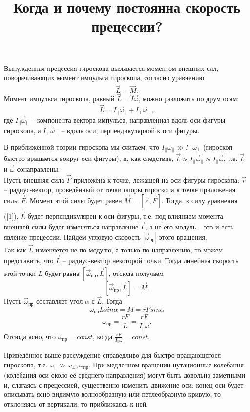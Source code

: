 \documentclass[a4paper, 12pt]{article}
\title{\textbf{Когда и почему постоянна скорость прецессии?}}
\begin{document}
\maketitle

Вынужденная прецессия гироскопа вызывается моментом внешних сил, поворачивающих момент импульса гироскопа, согласно уравнению
\begin{equation}\label{1}
    \dot{\vec{L}} = \vec{M}.
\end{equation}
Момент импульса гироскопа, равный $\vec{L} = \hat{I} \vec{\omega}$, можно разложить по друм осям:
$$
\vec{L} = I_{||} \vec{\omega}_{||} + I_{\perp} \vec{\omega}_{\perp},
$$
где $I_{||} \vec{\omega}_{||}$ -- компонента вектора импульса, направленная вдоль оси фигуры гироскопа, а $I_{\perp} \vec{\omega}_{\perp}$ -- вдоль оси, перпендикулярной к оси фигуры.

В приближённой теории гироскопа мы считаем, что $I_{||} \omega_{||} \gg I_{\perp} \omega_{\perp}$ (гироскоп быстро вращается вокруг оси фигуры), и, как следствие, $\vec{L} \approx I_{||} \vec{\omega}_{||} \approx I_{||} \vec{\omega}$, т.е. $\vec{L}$ и $\vec{\omega}$ сонаправлены.
\\
Пусть внешняя сила $\vec{F}$ приложена к точке, лежащей на оси фигуры гироскопа; $\vec{r}$ -- радиус-вектор, проведённый от точки опоры гироскопа к точке приложения силы $\vec{F}$. Момент этой силы будет равен $\vec{M} = [\vec{r},\vec{F}]$. Тогда, в силу уравнения (\ref{1}), $\dot{\vec{L}}$ будет перпендикулярен к оси фигуры, т.е. под влиянием момента внешней силы будет изменяться направление $\vec{L}$, а не его модуль -- это и есть явление прецессии. Найдём угловую скорость $|\vec{\omega}_{пр}|$ этого вращения.
\\
Так как $\vec{L}$ изменяется не по модулю, а только по направлению, то можем представить, что $\vec{L}$ -- радиус-вектор некоторой точки. Тогда линейная скорость этой точки $\dot{\vec{L}}$ будет равна $[\vec{\omega}_{пр}, \vec{L}]$, отсюда получаем
$$
[\vec{\omega}_{пр}, \vec{L}] = \vec{M}.
$$
Пусть $\vec{\omega}_{пр}$ составляет угол $\alpha$ с $\vec{L}$. Тогда
$$
\omega_{пр} L sin \alpha = M = r F sin \alpha
$$
$$
\omega_{пр} = \frac{r F}{L} = \frac{r F}{I_{||} \omega}.
$$
Отсюда ясно, что $\omega_{пр} = const$, когда $\frac{r F}{I_{||} \omega} = const$.

Приведённое выше рассуждение справедливо для быстро вращающегося гироскопа, т.е. $\omega_{||} \gg \omega_{\perp}, \omega_{пр}$. При медленном вращении нутационные колебания (колебания оси около её среднего направления) могут быть довольно заметными и, слагаясь с прецессией, существенно изменить движение оси: конец оси будет описывать ясно видимую волнообразную или петлеобразную кривую, то отклоняясь от вертикали, то приближаясь к ней.
\end{document}
